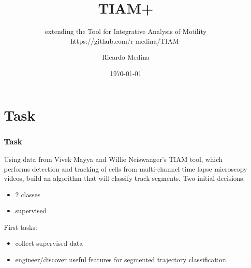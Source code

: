 \documentclass[8pt]{beamer}
\begin{document}
\title{TIAM+}
\subtitle{extending the Tool for Integrative Analysis of Motility\\ https://github.com/r-medina/TIAM-}
\author{Ricardo Medina}
\date{\today}


\frame{\titlepage}

\section{Task}
\begin{frame}
  \frametitle{Task}
  Using data from Vivek Mayya and Willie Neiswanger's TIAM tool, which
  performs detection and tracking of cells from multi-channel time
  lapse microscopy videos, build an algorithm that will classify track
  segments. Two initial decisions:
  \begin{itemize}
  \item 2 classes
  \item supervised
  \end{itemize}
  First tasks:
  \begin{itemize}
  \item collect supervised data
  \item engineer/discover useful features for segmented trajectory
    classification
  \end{itemize}
  \begin{columns}
    \begin{column}[t]{0.5\textwidth}
    \end{column}

    \begin{column}[t]{0.5\textwidth}
    \end{column}
  \end{columns}

\end{frame}
\end{document}
